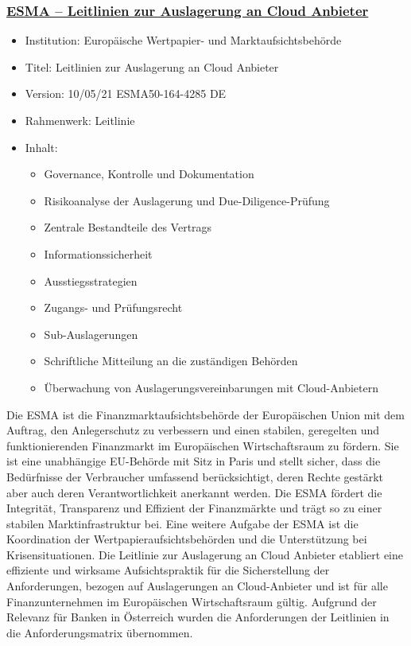 \subsubsection{\underline{ESMA – Leitlinien zur Auslagerung an Cloud Anbieter}}
\begin{itemize}
    \item Institution: Europäische Wertpapier- und Marktaufsichtsbehörde
    \item Titel: Leitlinien zur Auslagerung an Cloud Anbieter \autocite{ESMA_Cloud}
    \item Version: 10/05/21 ESMA50-164-4285 DE
    \item Rahmenwerk: Leitlinie
    \item Inhalt: 
        \begin{itemize}
        \item Governance, Kontrolle und Dokumentation
        \item Risikoanalyse der Auslagerung und Due-Diligence-Prüfung
        \item Zentrale Bestandteile des Vertrags
        \item Informationssicherheit
        \item Ausstiegsstrategien
        \item Zugangs- und Prüfungsrecht
        \item Sub-Auslagerungen
        \item Schriftliche Mitteilung an die zuständigen Behörden
        \item Überwachung von Auslagerungsvereinbarungen mit Cloud-Anbietern
    \end{itemize}
\end{itemize}
\bigbreak
Die ESMA ist die Finanzmarktaufsichtsbehörde der Europäischen Union mit dem Auftrag, den Anlegerschutz zu verbessern und einen stabilen, geregelten und funktionierenden Finanzmarkt im Europäischen Wirtschaftsraum zu fördern. Sie ist eine unabhängige EU-Behörde mit Sitz in Paris und stellt sicher, dass die Bedürfnisse der Verbraucher umfassend berücksichtigt, deren Rechte gestärkt aber auch deren Verantwortlichkeit anerkannt werden. Die ESMA fördert die Integrität, Transparenz und Effizient der Finanzmärkte und trägt so zu einer stabilen Marktinfrastruktur bei. Eine weitere Aufgabe der ESMA ist die Koordination der Wertpapieraufsichtsbehörden und die Unterstützung bei Krisensituationen. Die Leitlinie zur Auslagerung an Cloud Anbieter etabliert eine effiziente und wirksame Aufsichtspraktik für die Sicherstellung der Anforderungen, bezogen auf Auslagerungen an Cloud-Anbieter und ist für alle Finanzunternehmen im Europäischen Wirtschaftsraum gültig. Aufgrund der Relevanz für Banken in Österreich wurden die Anforderungen der Leitlinien in die Anforderungsmatrix übernommen. \autocite{ESMA}

